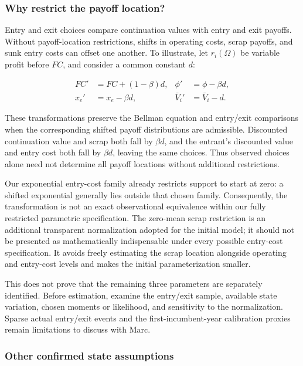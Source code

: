 \documentclass[10pt,]{article}
\begin{document}
\subsubsection{Why restrict the payoff
location?}\label{why-restrict-the-payoff-location}

Entry and exit choices compare continuation values with entry and exit
payoffs. Without payoff-location restrictions, shifts in operating
costs, scrap payoffs, and sunk entry costs can offset one another. To
illustrate, let \(r_i(\Omega)\) be variable profit before \(FC\), and
consider a common constant \(d\):

\[
\begin{aligned}
FC'&=FC+(1-\beta)d, & \phi'&=\phi-\beta d,\\
x_e'&=x_e-\beta d, & \bar V_i'&=\bar V_i-d.
\end{aligned}
\]

These transformations preserve the Bellman equation and entry/exit
comparisons when the corresponding shifted payoff distributions are
admissible. Discounted continuation value and scrap both fall by
\(\beta d\), and the entrant's discounted value and entry cost both fall
by \(\beta d\), leaving the same choices. Thus observed choices alone
need not determine all payoff locations without additional restrictions.

Our exponential entry-cost family already restricts support to start at
zero: a shifted exponential generally lies outside that chosen family.
Consequently, the transformation is not an exact observational
equivalence within our fully restricted parametric specification. The
zero-mean scrap restriction is an additional transparent normalization
adopted for the initial model; it should not be presented as
mathematically indispensable under every possible entry-cost
specification. It avoids freely estimating the scrap location alongside
operating and entry-cost levels and makes the initial parameterization
smaller.

This does not prove that the remaining three parameters are separately
identified. Before estimation, examine the entry/exit sample, available
state variation, chosen moments or likelihood, and sensitivity to the
normalization. Sparse actual entry/exit events and the
first-incumbent-year calibration proxies remain limitations to discuss
with Marc.

\subsubsection{Other confirmed state
assumptions}\label{other-confirmed-state-assumptions}
\end{document}
